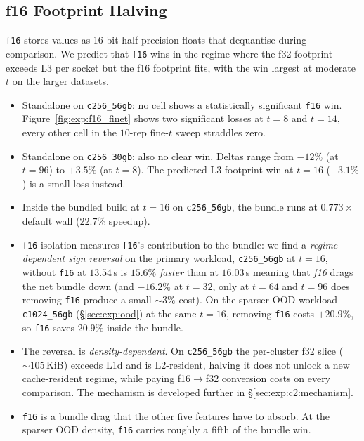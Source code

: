 \subsection{f16 Footprint Halving\label{sec:exp:c2:f16}}

\texttt{f16} stores values as 16-bit half-precision floats that dequantise during comparison. We predict that \texttt{f16} wins in the regime where the f32 footprint exceeds L3 per socket but the f16 footprint fits, with the win largest at moderate $t$ on the larger datasets.

\begin{itemize}
  \item Standalone on \texttt{c256\_56gb}: no cell shows a statistically significant \texttt{f16} win. Figure~\ref{fig:exp:f16_finet} shows two significant losses at $t{=}8$ and $t{=}14$, every other cell in the $10$-rep fine-$t$ sweep straddles zero.
  \item Standalone on \texttt{c256\_30gb}: also no clear win. Deltas range from $-12\%$ (at $t{=}96$) to $+3.5\%$ (at $t{=}8$). The predicted L3-footprint win at $t{=}16$ ($+3.1\%$) is a small loss instead.
  \item Inside the bundled \bcombo{} build at $t{=}16$ on \texttt{c256\_56gb}, the bundle runs at $0.773\times$ default wall ($22.7\%$ speedup).
  \item \texttt{f16} isolation measures \texttt{f16}'s contribution to the bundle: we find a \emph{regime-dependent sign reversal} on the primary workload, \texttt{c256\_56gb} at $t{=}16$, \bcombo{} without \texttt{f16} at $13.54$\,s is $15.6\%$ \emph{faster} than \bcombo{} at $16.03$\,s meaning that \emph{f16} drags the net bundle down (and $-16.2\%$ at $t{=}32$, only at $t{=}64$ and $t{=}96$ does removing \texttt{f16} produce a small $\sim\!3\%$ cost). On the sparser OOD workload \texttt{c1024\_56gb} (§\ref{sec:exp:ood}) at the same $t{=}16$, removing \texttt{f16} costs $+20.9\%$, so \texttt{f16} saves $20.9\%$ inside the bundle.
  \item The reversal is \emph{density-dependent}. On \texttt{c256\_56gb} the per-cluster f32 slice ($\sim\!105$\,KiB) exceeds L1d and is L2-resident, halving it does not unlock a new cache-resident regime, while paying f16$\to$f32 conversion costs on every comparison. The mechanism is developed further in §\ref{sec:exp:c2:mechanism}.
  \item \texttt{f16} is a bundle drag that the other five features have to absorb. At the sparser OOD density, \texttt{f16} carries roughly a fifth of the bundle win.
\end{itemize}

